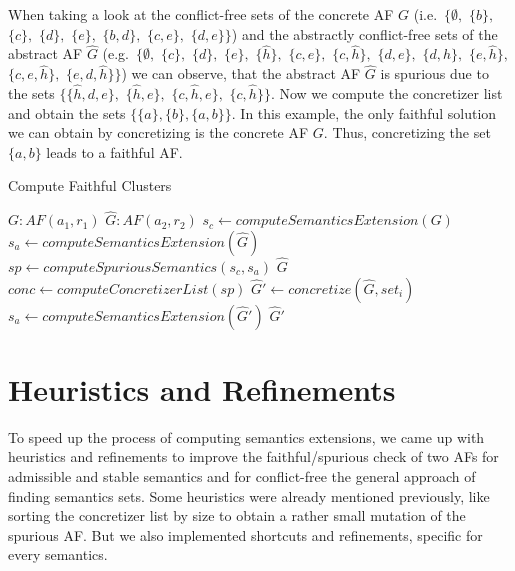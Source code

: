 When taking a look at the conflict-free sets of the concrete AF $G$ (i.e.\ $\bigl\{ \emptyset,$ $\{b\},$ $\{c\},$ $\{d\},$ $\{e\},$ $\{b, d\},$  $\{c, e\},$ $\{d, e\} \bigl\}$) and the abstractly conflict-free sets of the abstract AF $\hat{G}$ (e.g.\ $\bigl\{ \emptyset,$ $\{c\},$ $\{d\},$ $\{e\},$ $\{\hat{h}\},$ $\{c, e\},$ $\{c, \hat{h}\},$ $\{d, e\},$ $\{d, \hat{h}\},$ $\{e, \hat{h}\},$ $\{c, e, \hat{h}\},$ $\{e, d, \hat{h}\} \bigl\}$) we can observe, that the abstract AF $\hat{G}$ is spurious due to the sets $\bigl\{\{\hat{h}, d, e\},$ $\{\hat{h}, e\},$ $\{c, \hat{h}, e\},$ $\{c, \hat{h}\}\bigl\}$. Now we compute the concretizer list and obtain the sets $\bigl\{ \{a\}, \{b\}, \{a, b\}\bigl\}$. In this example, the only faithful solution we can obtain by concretizing is the concrete AF $G$. Thus, concretizing the set $\{a, b\}$ leads to a faithful AF.
\vspace{0.5cm}

\begin{algorithm}
    \caption{Compute Faithful Clusters}\label{alg:computeFaithfulClusters}
    \begin{algorithmic}[1]
        \Require $G: AF(a_1, r_1)$ 
        \Require $\hat{G}: AF(a_2, r_2)$ 
        \State $s_c \gets computeSemanticsExtension(G)$
        \State $s_a \gets computeSemanticsExtension(\hat{G})$
        \State $sp \gets computeSpuriousSemantics(s_c, s_a)$
            \State \Return $\hat{G}$
        \EndIf
        \State $conc \gets computeConcretizerList(sp)$
            \State $\hat{G}' \gets concretize(\hat{G}, set_i)$
            \State $s_a \gets computeSemanticsExtension(\hat{G}')$
                \State \Return $\hat{G}'$
            \EndIf
        \EndFor
    \end{algorithmic}
\end{algorithm}



\newpage
\section{Heuristics and Refinements}
\label{sec:HeuristicsAndRefinements}

To speed up the process of computing semantics extensions, we came up with heuristics and refinements to improve the faithful/spurious check of two AFs for admissible and stable semantics and for conflict-free the general approach of finding semantics sets. Some heuristics were already mentioned previously, like sorting the concretizer list by size to obtain a rather small mutation of the spurious AF. But we also implemented shortcuts and refinements, specific for every semantics.


